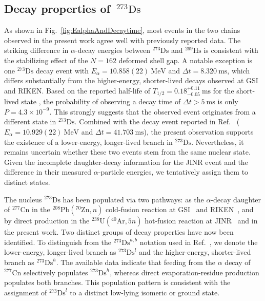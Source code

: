 \documentclass[final,5p,times,twocolumn,number,sort&compress]{elsarticle}
\begin{document}
\subsection{\texorpdfstring{Decay properties of~$^{273}\mathrm{Ds}$}{Decay properties of 273Ds}}

As shown in Fig.~\ref{fig:EalphaAndDecaytime}, most events in the two chains observed in the present work agree well with previously reported data. The striking difference in $\alpha$-decay energies between $^{273}\mathrm{Ds}$ and $^{269}\mathrm{Hs}$ is consistent with the stabilizing effect of the $N=162$ deformed shell gap. A notable exception is one $^{273}\mathrm{Ds}$ decay event with $E_{\alpha} = 10.858(22)\ \mathrm{MeV}$ and $\Delta t = 8.320\ \mathrm{ms}$, which differs substantially from the higher-energy, shorter-lived decays observed at GSI and RIKEN. Based on the reported half-life of $T_{1/2}=0.18^{+0.11}_{-0.05}\ \mathrm{ms}$ for the short-lived state \cite{oganessian2024SynthesisDecayProperties}, the probability of observing a decay time of $\Delta t>5\ \mathrm{ms}$ is only $P=4.3\times10^{-9}$. This strongly suggests that the observed event originates from a different state in $^{273}\mathrm{Ds}$. Combined with the decay event reported in Ref.~\cite{oganessian2024SynthesisDecayProperties} ($E_{\alpha} = 10.929(22)\ \mathrm{MeV}$ and $\Delta t = 41.703\ \mathrm{ms}$), the present observation supports the existence of a lower-energy, longer-lived branch in $^{273}\mathrm{Ds}$. Nevertheless, it remains uncertain whether these two events stem from the same nuclear state. Given the incomplete daughter-decay information for the JINR event and the difference in their measured $\alpha$-particle energies, we tentatively assign them to distinct states.

The nucleus $^{273}\mathrm{Ds}$ has been populated via two pathways: as the $\alpha$-decay daughter of $^{277}\mathrm{Cn}$ in the $^{208}\mathrm{Pb}(^{70}\mathrm{Zn}, n)$ cold-fusion reaction at GSI~\cite{hofmann2002NewResultsElements,hofmann1996NewElement112} and RIKEN~\cite{sumita2013NewResultProduction,morita2007ExperimentSynthesisIsotope277}, and by direct production in the $^{238}\mathrm{U}(^{40}\mathrm{Ar}, 5n)$ hot-fusion reaction at JINR~\cite{oganessian2024SynthesisDecayProperties} and in the present work. Two distinct groups of decay properties have now been identified. To distinguish from the $^{273}\mathrm{Ds}^{a,b}$ notation used in Ref.~\cite{oganessian2024SynthesisDecayProperties}, we denote the lower-energy, longer-lived branch as $^{273}\mathrm{Ds}^{l}$ and the higher-energy, shorter-lived branch as $^{273}\mathrm{Ds}^{h}$. The available data indicate that feeding from the $\alpha$ decay of $^{277}\mathrm{Cn}$ selectively populates $^{273}\mathrm{Ds}^{h}$, whereas direct evaporation-residue production populates both branches. This population pattern is consistent with the assignment of $^{273}\mathrm{Ds}^{l}$ to a distinct low-lying isomeric or ground state.
\end{document}
